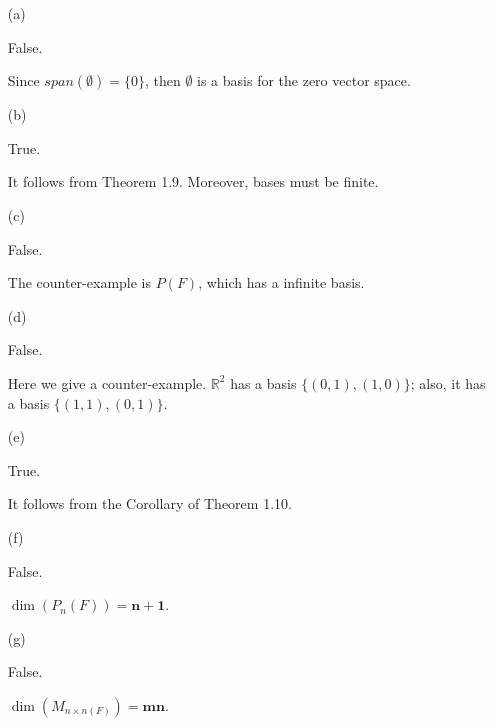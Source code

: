 \begin{Exercise}
\begin{enumerate}[(a)]
\item[(a)]
\begin{answer}
False.
\end{answer}
\begin{solution}
Since $span(\emptyset)=\{0\}$, then $\emptyset$ is a basis for the zero vector space.
\end{solution}

\item[(b)]
\begin{answer}
True.
\end{answer}
\begin{solution}
It follows from Theorem 1.9. Moreover, bases must be finite.
\end{solution}

\item[(c)]
\begin{answer}
False.
\end{answer}
\begin{solution}
The counter-example is $P(F)$, which has a infinite basis.
\end{solution}

\item[(d)]
\begin{answer}
False.
\end{answer}
\begin{solution}
Here we give a counter-example. $\mathbb{R}^2$ has a basis $\{(0,1), (1,0)\}$; also, it has a basis $\{(1,1),(0,1)\}$.
\end{solution}

\item[(e)]
\begin{answer}
True.
\end{answer}
\begin{solution}
It follows from the Corollary of Theorem 1.10.
\end{solution}

\item[(f)]
\begin{answer}
False.
\end{answer}
\begin{solution}
$\dim\left(P_n(F)\right) = \mathbf{n+1}$.
\end{solution}

\item[(g)]
\begin{answer}
False.
\end{answer}
\begin{solution}
$\dim\left(M_{n\times n(F)}\right) = \mathbf{m n}$.
\end{solution}


\end{enumerate}
\end{Exercise}
